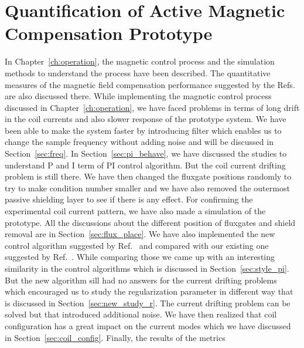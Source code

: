 

\chapter{Quantification of Active Magnetic Compensation Prototype}\label{ch:quantification}

In Chapter~\ref{ch:operation}, the magnetic control process and the
simulation methods to understand the process have been described. The
quantitative measures of the magnetic field compensation performance
suggested by the Refs.\cite{bea,lins,rawlik} are also discussed
there. While implementing the magnetic control process discussed in
Chapter~\ref{ch:operation}, we have faced problems in terms of long
drift in the coil currents and also slower response of the prototype
system. We have been able to make the system faster by introducing
filter which enables us to change the sample frequency without adding
noise and will be discussed in Section~\ref{sec:freq}. In
Section~\ref{sec:pi_behave}, we have discussed the studies to
understand P and I term of PI control algorithm. But the coil current
drifting problem is still there. We have then changed the fluxgate
positions randomly to try to make condition number smaller and we have
also removed the outermost passive shielding layer to see if there is
any effect. For confirming the experimental coil current pattern, we
have also made a simulation of the prototype. All the discussions
about the different position of fluxgates and shield removal are in
Section~\ref{sec:flux_place}. We have also implemented the new control
algorithm suggested by Ref.~\cite{rawlik} and compared with our
existing one suggested by Ref.~\cite{bea}. While comparing those we
came up with an interesting similarity in the control algorithms which
is discussed in Section~\ref{sec:style_pi}. But the new algorithm sill
had no answers for the current drifting problems which encouraged us
to study the regularization parameter in different way that is
discussed in Section~\ref{sec:new_study_r}. The current drifting
problem can be solved but that introduced additional noise. We have
then realized that coil configuration has a great impact on the
current modes which we have discussed in
Section~\ref{sec:coil_config}. Finally, the results of the metrics
